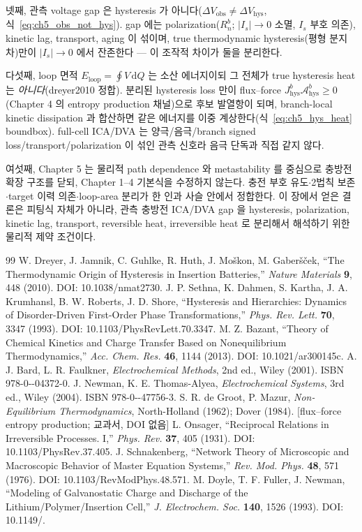 \documentclass[11pt,a4paper]{article}
\newcommand{\dd}{\mathrm{d}}
\newcommand{\hys}{\mathrm{hys}}
\newcommand{\obs}{\mathrm{obs}}
\newcommand{\brk}{\allowbreak}
\begin{document}
넷째, 관측 voltage gap 은 hysteresis 가 아니다(\textbf{$\Delta V_\obs\ne\Delta V_\hys$}, 식~\eqref{eq:ch5_obs_not_hys}).
gap 에는 polarization($R_n^b$; $|I_s|\to0$ 소멸, $I_s$ 부호 의존), kinetic lag, transport, aging 이 섞이며,
true thermodynamic hysteresis(평형 분지 차)만이 $|I_s|\to0$ 에서 잔존한다 — 이 조작적 차이가 둘을 분리한다.

다섯째, loop 면적 $E_{\mathrm{loop}}=\oint V\,\dd Q$ 는 소산 에너지이되 그 전체가 true hysteresis heat 는
\emph{아니다}(dreyer2010 정합). 분리된 hysteresis loss 만이 flux--force $J_\hys^b\mathcal A_\hys^b\ge0$
(Chapter 4 의 entropy production 채널)으로 후보 발열항이 되며, branch-local kinetic dissipation 과 합산하면
같은 에너지를 이중 계상한다(식~\eqref{eq:ch5_hys_heat} boundbox). full-cell ICA/DVA 는 양극/음극/branch signed
loss/transport/polarization 이 섞인 관측 신호라 음극 단독과 직접 같지 않다.

여섯째, Chapter 5 는 물리적 path dependence 와 metastability 를 중심으로 충방전 확장 구조를 닫되, Chapter 1--4
기본식을 수정하지 않는다. 충전 부호 유도$\cdot$2법칙 보존$\cdot$target 이력 의존$\cdot$loop-area 분리가 한 인과
사슬 안에서 정합한다. 이 장에서 얻은 결론은 피팅식 자체가 아니라, 관측 충방전 ICA/DVA gap 을 hysteresis,
polarization, kinetic lag, transport, reversible heat, irreversible heat 로 분리해서 해석하기 위한 물리적
제약 조건이다.

\begin{thebibliography}{99}
 W. Dreyer, J. Jamnik, C. Guhlke, R. Huth, J. Mo\v{s}kon, M. Gaber\v{s}\v{c}ek,
  ``The Thermodynamic Origin of Hysteresis in Insertion Batteries,'' \emph{Nature Materials} \textbf{9},
  448 (2010). DOI: 10.1038/\brk nmat2730.
 J. P. Sethna, K. Dahmen, S. Kartha, J. A. Krumhansl, B. W. Roberts, J. D. Shore,
  ``Hysteresis and Hierarchies: Dynamics of Disorder-Driven First-Order Phase Transformations,''
  \emph{Phys. Rev. Lett.} \textbf{70}, 3347 (1993). DOI: 10.1103/\brk PhysRevLett.70.3347.
 M. Z. Bazant, ``Theory of Chemical Kinetics and Charge Transfer Based on
  Nonequilibrium Thermodynamics,'' \emph{Acc. Chem. Res.} \textbf{46}, 1144 (2013). DOI: 10.1021/\brk ar300145c.
 A. J. Bard, L. R. Faulkner, \emph{Electrochemical Methods}, 2nd ed., Wiley (2001).
  ISBN 978-0-\brk 471-04372-0.
 J. Newman, K. E. Thomas-Alyea, \emph{Electrochemical Systems}, 3rd ed., Wiley (2004).
  ISBN 978-0-\brk 471-47756-3.
 S. R. de Groot, P. Mazur, \emph{Non-Equilibrium Thermodynamics},
  North-Holland (1962); Dover (1984). [flux--force entropy production; 교과서, DOI 없음]
 L. Onsager, ``Reciprocal Relations in Irreversible Processes. I,'' \emph{Phys. Rev.}
  \textbf{37}, 405 (1931). DOI: 10.1103/\brk PhysRev.37.405.
 J. Schnakenberg, ``Network Theory of Microscopic and Macroscopic Behavior of
  Master Equation Systems,'' \emph{Rev. Mod. Phys.} \textbf{48}, 571 (1976). DOI: 10.1103/\brk RevModPhys.48.571.
 M. Doyle, T. F. Fuller, J. Newman, ``Modeling of Galvanostatic Charge and Discharge
  of the Lithium/Polymer/Insertion Cell,'' \emph{J. Electrochem. Soc.} \textbf{140}, 1526 (1993).
  DOI: 10.1149/\brk 1.2221597.
\end{thebibliography}
\end{document}
